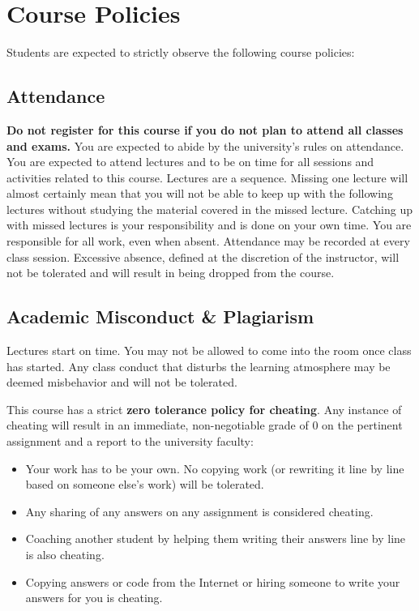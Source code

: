 \documentclass[10pt,a4paper,american]{exam}
\begin{document}
\section{Course Policies}
Students are expected to strictly observe the following course policies:

\subsection{Attendance}
\textbf{Do not register for this course if you do not plan to attend all classes and exams.} You are expected to abide by the university's rules on attendance. You are expected to attend lectures and to be on time for all sessions and activities related to this course. Lectures are a sequence. Missing one lecture will almost certainly mean that you will not be able to keep up with the following lectures without studying the material covered in the missed lecture. Catching up with missed lectures is your responsibility and is done on your own time. You are responsible for all work, even when absent. Attendance may be recorded at every class session. Excessive absence, defined at the discretion of the instructor, will not be tolerated and will result in being dropped from the course.

\subsection{Academic Misconduct \& Plagiarism}
Lectures start on time. You may not be allowed to come into the room once class has started. Any class conduct that disturbs the learning atmosphere may be deemed misbehavior and will not be tolerated.

This course has a strict \textbf{zero tolerance policy for cheating}. Any instance of cheating will result in an immediate, non-negotiable grade of 0 on the pertinent assignment and a report to the university faculty:
\begin{itemize}
	\item Your work has to be your own. No copying work (or rewriting it line by line based on someone else's work) will be tolerated.
	\item Any sharing of any answers on any assignment is considered cheating.
	\item Coaching another student by helping them writing their answers line by line is also cheating.
	\item Copying answers or code from the Internet or hiring someone to write your answers for you is cheating.
\end{itemize}
\end{document}
